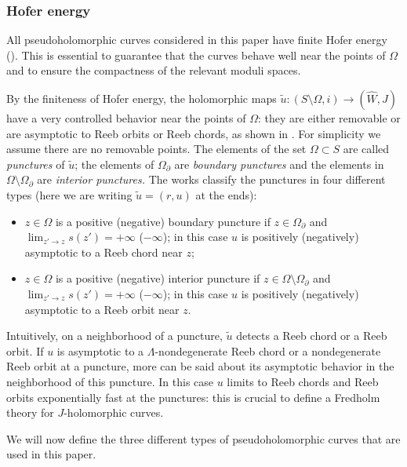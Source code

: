 \documentclass[JEP,XML,SOM,Unicode,NoFloatCountersInSection]{cedram}
\theoremstyle{plain}
\theoremstyle{definition}
\numberwithin{equation}{subsection}
\begin{document}
\subsubsection{Hofer energy}

All pseudoholomorphic curves considered in this paper have finite Hofer energy (\cf \cite{H,CPT}). This is essential to guarantee that the curves behave well near the points of $\Omega$ and to ensure the compactness of the relevant moduli spaces.

By the finiteness of Hofer energy, the holomorphic maps $\widetilde{u}: (S\setminus \Omega,i)\to (\widehat{W},J)$ have a very controlled behavior near the points of $\Omega$: they are either removable or are asymptotic to Reeb orbits or Reeb chords, as shown in \cite{Ab,H,HWZ}. For simplicity we assume there are no removable points.
The elements of the set $\Omega \subset S$ are called {\em punctures} of $\widetilde{u}$; the elements of $\Omega_\partial$ are {\em boundary punctures} and the elements in $\Omega \setminus \Omega_\partial$ are {\em interior punctures.} The works \cite{Ab,H,HWZ} classify the punctures in four different types (here we are writing $\widetilde{u}=(r,u)$ at the ends):
\begin{itemize}
\item $z \in \Omega$ is a positive (\resp negative) boundary puncture if $z \in \Omega_\partial$ and $\lim_{z' \to z} s(z') = +\infty$ (\resp $-\infty$); in this case $u$ is positively (\resp negatively) asymptotic to a Reeb chord near $z$;

\item $z \in \Omega$ is a positive (\resp negative) interior puncture if $z \in \Omega \setminus \Omega_\partial$ and $\lim_{z' \to z} s(z') = +\infty$ (\resp $-\infty$); in this case $u$ is positively (\resp negatively) asymptotic to a Reeb orbit near $z$.

\end{itemize}
Intuitively, on a neighborhood of a puncture, $\widetilde{u}$ detects a Reeb chord or a Reeb orbit. If $u$ is asymptotic to a $\Lambda$-nondegenerate Reeb chord or a nondegenerate Reeb orbit at a puncture, more can be said about its asymptotic behavior in the neighborhood of this puncture. In this case $u$ limits to Reeb chords and Reeb orbits exponentially fast at the punctures: this is crucial to define a Fredholm theory for $J$-holomorphic curves.

We will now define the three different types of pseudoholomorphic curves that are used in this paper.
\end{document}
